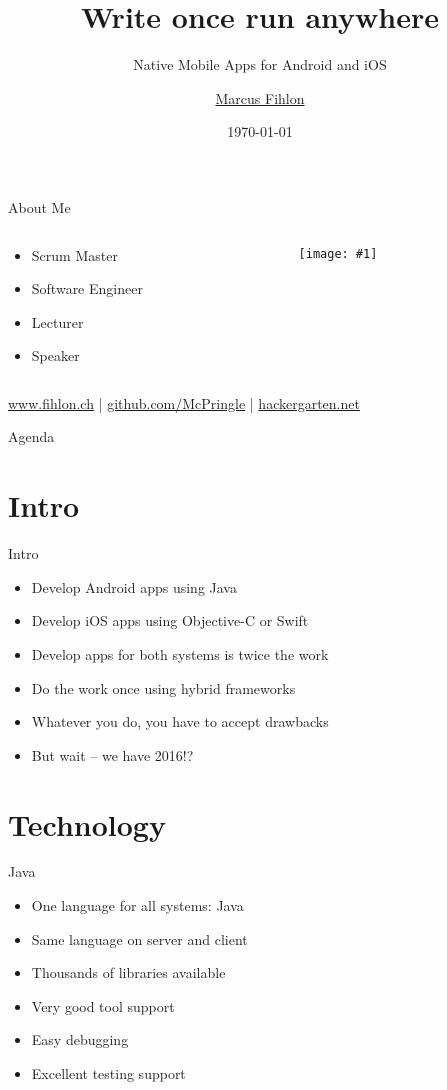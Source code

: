 \documentclass{beamer}
\title{Write once run anywhere}
\subtitle{Native Mobile Apps for Android and iOS}
\author{\href{https://www.fihlon.ch/}{Marcus Fihlon}}
\institute[Fihlon]{\href{https://www.fihlon.ch/}{Scrum Master | Software Engineer | Lecturer | Speaker}}
\date{\today}
\newcommand{\myfig}[2]{
	\begin{minipage}[c]{\textwidth}
		\begin{center}
			\texttt{[image: \#1]}
		\end{center}
		\vspace{3mm}
	\end{minipage}
}
\newcommand{\slideItems}[1]{
	\begin{itemize}
		#1
	\end{itemize}
}
\newcommand{\slide}[2]{
	\begin{frame}{#1}
		#2
	\end{frame}
}
\begin{document}
\maketitle
\newlength\someheight

\slide{About Me}{
	\begin{columns}
    	\begin{column}{5cm}
		\slideItems{
			\item Scrum Master
			\item Software Engineer
			\item Lecturer
			\item Speaker
		}
    	\end{column}
	    \begin{column}{5cm}
        	\myfig{McPringle}{0.8}
    	\end{column}
	\end{columns}
	\href{https://www.fihlon.ch}{www.fihlon.ch} |
	\href{https://github.com/McPringle}{github.com/McPringle} |
	\href{http://hackergarten.net}{hackergarten.net}
}

\slide{Agenda}{
	\setcounter{tocdepth}{1}
	\tableofcontents
}

\section{Intro}

\slide{Intro}{
	\slideItems{
		\item Develop Android apps using Java
		\item Develop iOS apps using Objective-C or Swift
		\item Develop apps for both systems is twice the work
		\item Do the work once using hybrid frameworks
		\item Whatever you do, you have to accept drawbacks
		\item But wait -- we have 2016!?
	}
}

\section{Technology}

\slide{Java}{
	\slideItems{
		\item One language for all systems: Java
		\item Same language on server and client
		\item Thousands of libraries available
		\item Very good tool support
		\item Easy debugging
		\item Excellent testing support
	}
}
\end{document}
